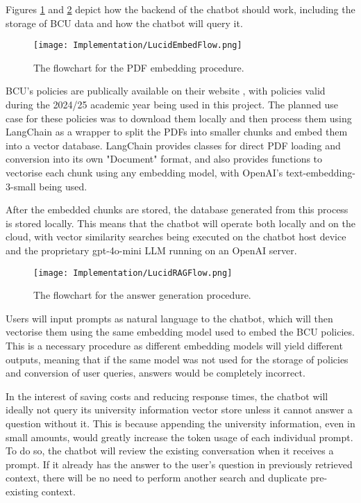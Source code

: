 \para Figures \ref{fig:EmbedFlowchart} and \ref{fig:RAGFlowchart} depict how the backend of the chatbot should work, including the 
storage of BCU data and how the chatbot will query it.

\begin{figure}[H]
    \centering
    \texttt{[image: Implementation/LucidEmbedFlow.png]}
    \caption{The flowchart for the PDF embedding procedure.\label{fig:EmbedFlowchart}}
\end{figure}

\noindent BCU's policies are publically available on their website \autocite{bcuPoliciesProcedures}, with policies valid during the 2024/25 academic
year being used in this project. The planned use case for these policies was to download them locally and then process them using LangChain as a 
wrapper to split the PDFs into smaller chunks and embed them into a vector database. LangChain provides classes for direct PDF loading and 
conversion into its own "Document" format, and also provides functions to vectorise each chunk using any embedding model, with OpenAI's 
text-embedding-3-small being used. 

\para After the embedded chunks are stored, the database generated from this process is stored locally. This means that the chatbot will operate 
both locally and on the cloud, with vector similarity searches being executed on the chatbot host device and the proprietary gpt-4o-mini LLM running 
on an OpenAI server.

\begin{figure}[H]
    \centering
    \texttt{[image: Implementation/LucidRAGFlow.png]}
    \caption{The flowchart for the answer generation procedure.\label{fig:RAGFlowchart}}
\end{figure}

\noindent Users will input prompts as natural language to the chatbot, which will then vectorise them using the same embedding model used 
to embed the BCU policies. This is a necessary procedure as different embedding models will yield different outputs, meaning that if the same 
model was not used for the storage of policies and conversion of user queries, answers would be completely incorrect. 

\para In the interest of saving costs and reducing response times, the chatbot will ideally not query its university information vector store 
unless it cannot answer a question without it. This is because appending the university information, even in small amounts, would 
greatly increase the token usage of each individual prompt. To do so, the chatbot will review the existing conversation when it receives a 
prompt. If it already has the answer to the user's question in previously retrieved context, there will be no need to perform another search 
and duplicate pre-existing context.

